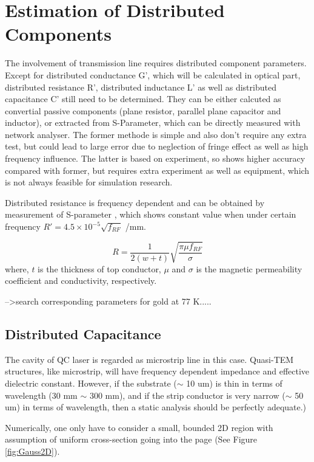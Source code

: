 \documentclass[11pt,final]{scrbook}
\begin{document}
\section{Estimation of Distributed Components}
The involvement of transmission line requires distributed component parameters. Except for distributed conductance G', which will be calculated in optical part, distributed resistance R', distributed inductance L' as well as distributed capacitance C' still need to be determined. They can be either calcuted as convertial passive components (plane resistor, parallel plane capacitor and inductor), or extracted from S-Parameter, which can be directly measured with network analyser. The former methode is simple and also don't require any extra test, but could lead to large error due to neglection of fringe effect\cite{pillai1970fringing} as well as high frequency influence. The latter is based on experiment, so shows higher accuracy compared with former, but requires extra experiment as well as equipment, which is not always feasible for simulation research. 

Distributed resistance is frequency dependent and can be obtained by measurement of S-parameter \cite{maineult2010microwave}, which shows constant value when under certain frequency $ R'=4.5\times10^{-5}\sqrt{f_{RF}}$ /mm.

\begin{equation}
R=\frac{1}{2(w+t)}\sqrt{\frac{\pi \mu f_{RF} }{\sigma}}
\end{equation}
where, $t$ is the thickness of top conductor, $\mu$ and $\sigma$ is the magnetic permeability coefficient and conductivity, respectively.

-->search corresponding parameters for gold at 77 K.....

\subsection{Distributed Capacitance}
The cavity of QC laser is regarded as microstrip line in this case. Quasi-TEM structures, like microstrip, will have frequency dependent impedance and effective dielectric constant. However, if the substrate ($\sim$ 10 um) is thin in terms of wavelength (30 mm $\sim$ 300 mm), and if the strip conductor is very narrow ($\sim$ 50 um) in terms of wavelength, then a static analysis should be perfectly adequate.)

Numerically, one only have to consider a small, bounded 2D region with assumption of uniform cross-section going into the page (See Figure \ref{fig:Gauss2D}). 
\end{document}
